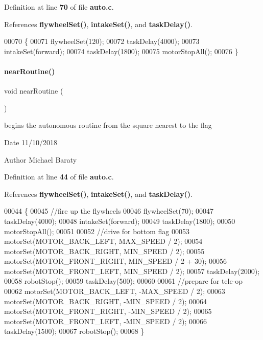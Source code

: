 Definition at line \textbf{ 70} of file \textbf{ auto.\+c}.



References \textbf{ flywheel\+Set()}, \textbf{ intake\+Set()}, and \textbf{ task\+Delay()}.


\begin{DoxyCode}
00070                   \{
00071   flywheelSet(120);
00072   taskDelay(4000);
00073   intakeSet(forward);
00074   taskDelay(1800);
00075   motorStopAll();
00076   \}
\end{DoxyCode}
\mbox{\label{auton_8h_a91e751e72f029bd76a19bb6e40d570ce}} 
\paragraph{near\+Routine()}
{\footnotesize\ttfamily void near\+Routine (\begin{DoxyParamCaption}{ }\end{DoxyParamCaption})}



begins the autonomous routine from the square nearest to the flag 

\begin{DoxyDate}{Date}
11/10/2018 
\end{DoxyDate}
\begin{DoxyAuthor}{Author}
Michael Baraty 
\end{DoxyAuthor}


Definition at line \textbf{ 44} of file \textbf{ auto.\+c}.



References \textbf{ flywheel\+Set()}, \textbf{ intake\+Set()}, and \textbf{ task\+Delay()}.


\begin{DoxyCode}
00044                    \{
00045   \textcolor{comment}{//fire up the flywheels}
00046   flywheelSet(70);
00047   taskDelay(4000);
00048   intakeSet(forward);
00049   taskDelay(1800);
00050   motorStopAll();
00051 
00052   \textcolor{comment}{//drive for bottom flag}
00053   motorSet(MOTOR_BACK_LEFT, MAX_SPEED / 2);
00054   motorSet(MOTOR_BACK_RIGHT, MIN_SPEED / 2);
00055   motorSet(MOTOR_FRONT_RIGHT, MIN_SPEED / 2 + 30);
00056   motorSet(MOTOR_FRONT_LEFT, MIN_SPEED / 2);
00057   taskDelay(2000);
00058   robotStop();
00059   taskDelay(500);
00060 
00061   \textcolor{comment}{//prepare for tele-op}
00062   motorSet(MOTOR_BACK_LEFT, -MAX_SPEED / 2);
00063   motorSet(MOTOR_BACK_RIGHT, -MIN_SPEED / 2);
00064   motorSet(MOTOR_FRONT_RIGHT, -MIN_SPEED / 2);
00065   motorSet(MOTOR_FRONT_LEFT, -MIN_SPEED / 2);
00066   taskDelay(1500);
00067   robotStop();
00068 \}
\end{DoxyCode}
